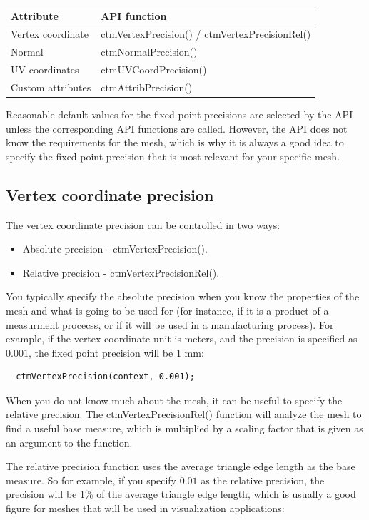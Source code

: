 \begin{tabular}{|l|l|}\hline
\textbf{Attribute} & \textbf{API function}\\ \hline
Vertex coordinate & ctmVertexPrecision() / ctmVertexPrecisionRel()\\ \hline
Normal & ctmNormalPrecision()\\ \hline
UV coordinates & ctmUVCoordPrecision()\\ \hline
Custom attributes & ctmAttribPrecision()\\ \hline
\end{tabular}

Reasonable default values for the fixed point precisions are selected by the API
unless the corresponding API functions are called. However, the API does not know
the requirements for the mesh, which is why it is always a good idea to specify
the fixed point precision that is most relevant for your specific mesh.


\subsection{Vertex coordinate precision}
The vertex coordinate precision can be controlled in two ways:

\begin{itemize}
  \item Absolute precision - ctmVertexPrecision().
  \item Relative precision - ctmVertexPrecisionRel().
\end{itemize}

You typically specify the absolute precision when you know the properties of the
mesh and what is going to be used for (for instance, if it is a product of a
measurment procecss, or if it will be used in a manufacturing process). For
example, if the vertex coordinate unit is meters, and the precision is specified
as $0.001$, the fixed point precision will be 1 mm:

\begin{lstlisting}
  ctmVertexPrecision(context, 0.001);
\end{lstlisting}

When you do not know much about the mesh, it can be useful to specify the
relative precision. The ctmVertexPrecisionRel() function will analyze the mesh
to find a useful base measure, which is multiplied by a scaling factor that
is given as an argument to the function.

The relative precision function uses the average triangle edge length as the
base measure. So for example, if you specify $0.01$ as the relative precision,
the precision will be 1\% of the average triangle edge length, which is usually
a good figure for meshes that will be used in visualization applications:

